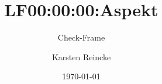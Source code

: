 \documentclass[]{beamer}
\title{LF00:00:00:Aspekt}
\subtitle{Check-Frame}
\institute{GS-LDK}
\author{Karsten Reincke}
\date{\today}
\def\cfgGl{../../../../cfg.gl/}
\begin{document}

\begin{frame}
  \titlepage
\end{frame}






\logo{}
\newpage




\end{document}
